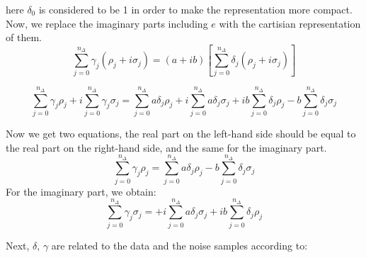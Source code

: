 \begin{enumerate}
here $\delta_0$ is considered to be 1 in order to make the representation more compact. Now, we replace the imaginary parts including $e$ with the cartisian representation of them.
\[
\sum_{j=0}^{n_\Delta} \gamma_j \left( \rho_j + i \sigma_j \right) 
= 
(a + i b) 
\left[ 
\sum_{j=0}^{n_\Delta} \delta_j \left( \rho_j + i \sigma_j \right) 
\right]
\]

\[
\sum_{j=0}^{n_\Delta} \gamma_j \rho_j + i \sum_{j=0}^{n_\Delta} \gamma_j \sigma_j 
= 
\sum_{j=0}^{n_\Delta} a \delta_j \rho_j + i \sum_{j=0}^{n_\Delta} a \delta_j \sigma_j 
+ i b \sum_{j=0}^{n_\Delta} \delta_j \rho_j - b \sum_{j=0}^{n_\Delta} \delta_j \sigma_j
\]

Now we get two equations, the real part on the left-hand side should be equal to the real part on the right-hand side, and the same for the imaginary part.
\[
\sum_{j=0}^{n_\Delta} \gamma_j \rho_j = \sum_{j=0}^{n_\Delta} a \delta_j \rho_j - b \sum_{j=0}^{n_\Delta} \delta_j \sigma_j
\]
For the imaginary part, we obtain:
\[
\sum_{j=0}^{n_\Delta} \gamma_j \sigma_j = + i \sum_{j=0}^{n_\Delta} a \delta_j \sigma_j 
+ i b \sum_{j=0}^{n_\Delta} \delta_j \rho_j
\]

Next, $\delta,\,\gamma$ are related to the data and the noise samples according to:

\end{enumerate}












